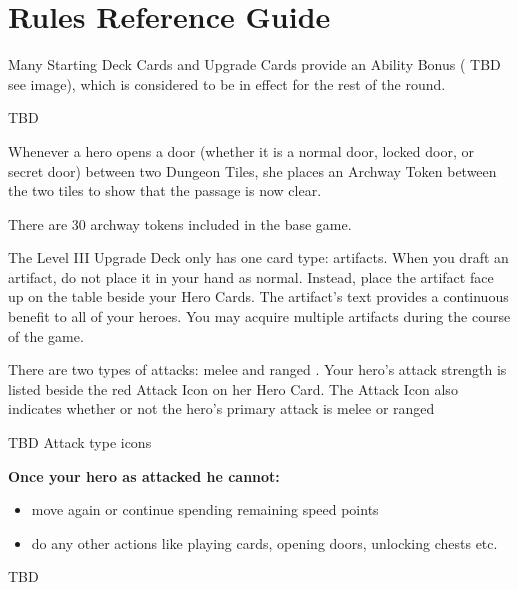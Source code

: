 \section{Rules Reference Guide}
\label{sec:RulesReferenceGuide}

Many Starting Deck Cards and Upgrade Cards provide an Ability Bonus ( TBD see image), which is considered to be in effect for the rest of the round.

TBD


Whenever a hero opens a door (whether it is a normal door, locked door, or secret door) between two Dungeon Tiles, she places an Archway Token between the two tiles to show that the passage is now clear.

There are 30 archway tokens included in the base game.


The Level III Upgrade Deck only has one card type: artifacts. When you draft an artifact, do not place it in your hand as normal. Instead, place the artifact face up on the table beside your Hero Cards. The artifact’s text provides a continuous benefit to all of your heroes. You may acquire multiple artifacts during the course of the game.


There are two types of attacks: melee and ranged . Your hero’s attack strength is listed beside the red Attack Icon on her Hero Card. The Attack Icon also indicates whether or not the hero’s primary attack is melee or ranged

TBD Attack type icons

\textbf{Once your hero as attacked he cannot:}
\begin{itemize}
  \item move again or continue spending remaining speed points
  \item do any other actions like playing cards, opening doors, unlocking chests etc.
\end{itemize}



TBD

